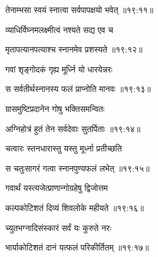 
{\devanagarifont तेनाम्भसा स्वयं स्नात्वा सर्वपापक्षयो भवेत् {॥१९:११॥} \veg\dontdisplaylinenum }%
 
{\devanagarifont व्याधिर्विघ्नमलक्ष्मीत्वं नश्यते सद्य एव च \thinspace{\dandab} \dontdisplaylinenum }%


{\devanagarifont मृतापत्यानपत्याश्च स्नानमेव प्रशस्यते {॥१९:१२॥} \veg\dontdisplaylinenum }%

{\devanagarifont गवां शृङ्गोदकं गृह्य मूर्ध्नि यो धारयेन्नरः \thinspace{\dandab} \dontdisplaylinenum }%


{\devanagarifont स सर्वतीर्थस्नानस्य फलं प्राप्नोति मानवः {॥१९:१३॥} \veg\dontdisplaylinenum }%

{\devanagarifont ग्रासमुष्टिप्रदानेन गोषु भक्तिसमन्वितः \thinspace{\dandab} \dontdisplaylinenum }%
 

{\devanagarifont अग्निहोत्रं हुतं तेन सर्वदेवाः सुतर्पिताः {॥१९:१४॥} \veg\dontdisplaylinenum }%

{\devanagarifont चत्वारः स्तनधारास्तु यस्तु मूर्ध्ना प्रतीच्छति \thinspace{\dandab} \dontdisplaylinenum }%
 

{\devanagarifont स चतुःसागरं गत्वा स्नानपुण्यफलं लभेत् {॥१९:१५॥} \veg\dontdisplaylinenum }%
 
{\devanagarifont गवार्थं यस्त्यजेत्प्राणान्गोग्रहेषु द्विजोत्तम \thinspace{\dandab} \dontdisplaylinenum }%
 

{\devanagarifont कल्पकोटिशतं दिव्यं शिवलोके महीयते {॥१९:१६॥} \veg\dontdisplaylinenum }%
 
{\devanagarifont च्युतभग्नादिसंस्कारं सर्वं यः कुरुते नरः \thinspace{\dandab} \dontdisplaylinenum }%
 

{\devanagarifont भार्याकोटिशतं दानं यत्फलं परिकीर्तितम् {॥१९:१७॥} \veg\dontdisplaylinenum  }%

